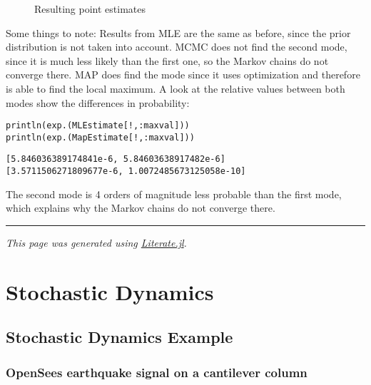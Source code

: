\begin{figure}
\centering
{}
\caption{Resulting point estimates}
\end{figure}
 Some things to note: Results from MLE are the same as before, since the prior distribution is not taken into account. MCMC does not find the second mode, since it is much less likely than the first one, so the Markov chains do not converge there. MAP does find the mode since it uses optimization and therefore is able to find the local maximum. A look at the relative values between both modes show the differences in probability:




\begin{verbatim}
println(exp.(MLEstimate[!,:maxval]))
println(exp.(MapEstimate[!,:maxval]))
\end{verbatim}


\begin{verbatim}
[5.846036389174841e-6, 5.84603638917482e-6]
[3.5711506271809677e-6, 1.0072485673125058e-10]
\end{verbatim}



The second mode is 4 orders of magnitude less probable than the first mode, which explains why the Markov chains do not converge there.



{\rule{\textwidth}{1pt}}


\emph{This page was generated using \href{https://github.com/fredrikekre/Literate.jl}{Literate.jl}.}



\chapter{Stochastic Dynamics}


\section{Stochastic Dynamics Example}



\label{6683717966732647304}{}


\subsection{OpenSees earthquake signal on a cantilever column}



